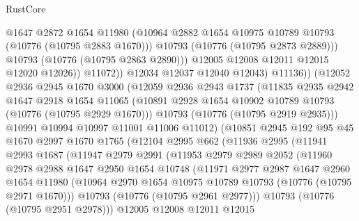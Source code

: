 \begin{lexlean}{RustCore}
\begin{coremodule}
                          @1647
                          @2872
                          @1654
                          @11980
                          (@10964 @2882 @1654 @10975 @10789 @10793 (@10776 (@10795 @2883 @1670)))
                          @10793
                          (@10776 (@10795 @2873 @2889)))
                        @10793
                        (@10776 (@10795 @2863 @2890)))
                      @12005
                      @12008
                      @12011
                      @12015
                      @12020
                      @12026))
                  @11072))
              @12034
              @12037
              @12040
              @12043)
            @11136))
        (@12052
          @2936
          @2945
          @1670
          @3000
          (@12059
            @2936
            @2943
            @1737
            (@11835
              @2935
              @2942
              @1647
              @2918
              @1654
              @11065
              (@10891 @2928 @1654 @10902 @10789 @10793 (@10776 (@10795 @2929 @1670)))
              @10793
              (@10776 (@10795 @2919 @2935)))
            @10991
            @10994
            @10997
            @11001
            @11006
            @11012)
          (@10851
            @2945
            @192
            @95
            @45
            @1670
            @2997
            @1670
            @1765
            (@12104
              @2995
              @662
              (@11936
                @2995
                (@11941
                  @2993
                  @1687
                  (@11947
                    @2979
                    @2991
                    (@11953
                      @2979
                      @2989
                      @2052
                      (@11960
                        @2978
                        @2988
                        @1647
                        @2950
                        @1654
                        @10748
                        (@11971
                          @2977
                          @2987
                          @1647
                          @2960
                          @1654
                          @11980
                          (@10964 @2970 @1654 @10975 @10789 @10793 (@10776 (@10795 @2971 @1670)))
                          @10793
                          (@10776 (@10795 @2961 @2977)))
                        @10793
                        (@10776 (@10795 @2951 @2978)))
                      @12005
                      @12008
                      @12011
                      @12015

\end{coremodule}
\end{lexlean}
